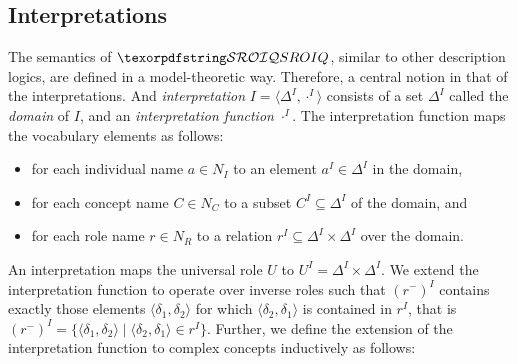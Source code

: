 \subsection{Interpretations} \label{interpretations}

The semantics of $\SROIQ$, similar to other description logics, are defined in a model-theoretic way. Therefore, a central notion in that of the interpretations. And \emph{interpretation} $I = \langle \Delta^I, \cdot^I \rangle$ consists of a set $\Delta^I$ called the \emph{domain} of $I$, and an \emph{interpretation function} $\cdot^I$. The interpretation function maps the vocabulary elements as follows:
\begin{itemize}
  \item for each individual name $a \in N_I$ to an element $a^I \in \Delta^I$ in the domain,
  \item for each concept name $C \in N_C$ to a subset $C^I \subseteq \Delta^I$ of the domain, and
  \item for each role name $r \in N_R$ to a relation $r^I \subseteq \Delta^I \times \Delta^I$ over the domain.
\end{itemize}
An interpretation maps the universal role $U$ to $U^I = \Delta^I \times \Delta^I$. We extend the interpretation function to operate over inverse roles such that  $\left(r^-\right)^I$ contains exactly those elements $\langle \delta_1, \delta_2 \rangle$ for which $\langle \delta_2, \delta_1 \rangle$ is contained in $r^I$, that is  $\left(r^-\right)^I = \{ \langle \delta_1, \delta_2 \rangle \mid \langle \delta_2, \delta_1 \rangle \in r^I \}$. Further, we define the extension of the interpretation function to complex concepts inductively as follows:
